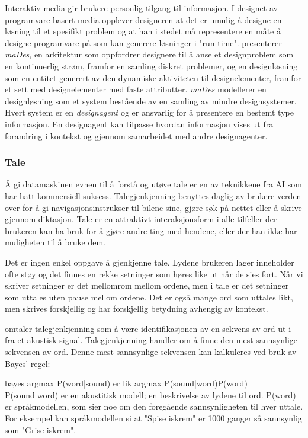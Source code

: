 Interaktiv media gir brukere personlig tilgang til informasjon. I designet av programvare-basert media opplever designeren at det er umulig å designe en løsning til et spesifikt problem og at han i stedet må representere en måte å designe programvare på som kan generere løsninger i "run-time". \citet{ishizaki96} presenterer \emph{maDes}, en arkitektur som oppfordrer designere til å anse et designproblem som en kontinuerlig strøm, framfor en samling diskret problemer, og en designløsning som en entitet generert av den dynamiske aktiviteten til designelementer, framfor et sett med designelementer med faste attributter. \emph{maDes} modellerer en designløsning som et system bestående av en samling av mindre designsystemer. Hvert system er en \emph{designagent} og er ansvarlig for å presentere en bestemt type informasjon. En designagent kan tilpasse hvordan informasjon vises ut fra forandring i kontekst og gjennom samarbeidet med andre designagenter.

\subsubsection*{Tale}
Å gi datamaskinen evnen til å forstå og utøve tale er en av teknikkene fra AI som har hatt kommersiell suksess. Talegjenkjenning benyttes daglig av brukere verden over for å gi navigasjonsinstrukser til bilene sine, gjøre søk på nettet eller å skrive gjennom diktasjon. Tale er en attraktivt interaksjonsform i alle tilfeller der brukeren kan ha bruk for å gjøre andre ting med hendene, eller der han ikke har muligheten til å bruke dem.

Det er ingen enkel oppgave å gjenkjenne tale. Lydene brukeren lager inneholder ofte støy og det finnes en rekke setninger som høres like ut når de sies fort. Når vi skriver setninger er det mellomrom mellom ordene, men i tale er det setninger som uttales uten pause mellom ordene. Det er også mange ord som uttales likt, men skrives forskjellig og har forskjellig betydning avhengig av kontekst.

\citet{russellnorvig10} omtaler talegjenkjenning som å være identifikasjonen av en sekvens av ord ut i fra et akustisk signal.
Talegjenkjenning handler om å finne den mest sannsynlige sekvensen av ord. Denne mest sannsynlige sekvensen kan kalkuleres ved bruk av Bayes' regel:

{\color{red}bayes} argmax P(word|sound) er lik argmax P(sound|word)P(word)
P(sound|word) er en akustitisk modell; en beskrivelse av lydene til ord. P(word) er språkmodellen, som sier noe om den foregående sannsynligheten til hver uttale. For eksempel kan språkmodellen si at "Spise iskrem" er 1000 ganger så sannsynlig som "Grise iskrem".

